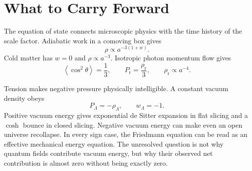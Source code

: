 \section{What to Carry Forward}

The equation of state connects microscopic physics with the time history of the scale factor. Adiabatic work in a comoving box gives
\[
\rho\propto a^{-3(1+w)}.
\]
Cold matter has \(w=0\) and \(\rho\propto a^{-3}\). Isotropic photon momentum flow gives
\[
\left\langle\cos^2\theta\right\rangle=\frac13,
\qquad
P_{\mathrm r}=\frac{\rho_{\mathrm r}}{3},
\qquad
\rho_{\mathrm r}\propto a^{-4}.
\]

Tension makes negative pressure physically intelligible. A constant vacuum density obeys
\[
P_\Lambda=-\rho_\Lambda,
\qquad
w_\Lambda=-1.
\]
Positive vacuum energy gives exponential de Sitter expansion in flat slicing and a \(\cosh\) bounce in closed slicing. Negative vacuum energy can make even an open universe recollapse. In every sign case, the Friedmann equation can be read as an effective mechanical energy equation. The unresolved question is not why quantum fields contribute vacuum energy, but why their observed net contribution is almost zero without being exactly zero.
